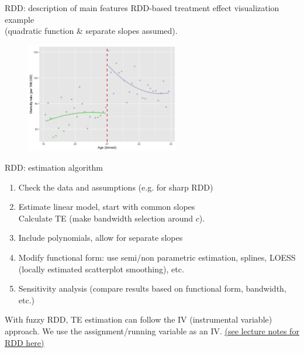 \documentclass{beamer}
\begin{document}
\begin{frame}{RDD: description of main features}
\centering
RDD-based treatment effect visualization example\\
(quadratic function \& separate slopes assumed).\\ \medskip
\begin{figure}
    \includegraphics[trim = 0cm 0cm 0cm 0cm, clip, width=0.6\textwidth]{./IMG/RDD2.png}
\end{figure}    
\end{frame}
\begin{frame}{RDD: estimation algorithm}
\begin{enumerate}
    \item Check the data and assumptions (e.g. for sharp RDD)
    \medskip
    \item Estimate linear model, start with common slopes \\ Calculate TE (make bandwidth selection around $c$).
    \medskip
    \item Include polynomials, allow for separate slopes
    \medskip
    \item Modify functional form: use semi/non parametric estimation, splines, LOESS (locally estimated scatterplot smoothing), etc.
    \medskip
    \item Sensitivity analysis (compare results based on functional form, bandwidth, etc.)
\end{enumerate}
\bigskip
With fuzzy RDD, TE estimation can follow the IV (instrumental variable) approach. We use the assignment/running variable as an IV. \textcolor{blue}{\underline{\href{https://clas.ucdenver.edu/marcelo-perraillon/teaching/health-services-research-methods-i-hsmp-7607}{(see lecture notes for RDD here)}}}
\end{frame}
\end{document}
